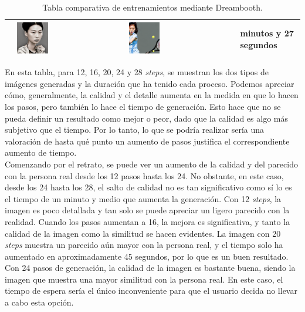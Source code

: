 \begin{table}
\begin{tabular}{>{\centering\arraybackslash}m{3cm} >{\centering\arraybackslash}m{4cm}>{\centering\arraybackslash}m{5cm}>{\centering\arraybackslash}m{3cm}}
		12 & \includegraphics[width = 0.3\textwidth]{Imagenes/Vectorial/12sojungclose.png} & \includegraphics[width = 0.3\textwidth]{Imagenes/Vectorial/12sojungtennis.png} & 2 minutos y 27 segundos\\
		\hline
	\end{tabular}
	\caption{Tabla comparativa de entrenamientos mediante Dreambooth.}
	\label{tab:tabladifsteps}
\end{table}

En esta tabla, para 12, 16, 20, 24 y 28 \textit{steps}, se muestran los dos tipos de imágenes generadas y la duración que ha tenido cada proceso. Podemos apreciar cómo, generalmente, la calidad y el detalle aumenta en la medida en que lo hacen los pasos, pero también lo hace el tiempo de generación. Esto hace que no se pueda definir un resultado como mejor o peor, dado que la calidad es algo más subjetivo que el tiempo. Por lo tanto, lo que se podría realizar sería una valoración de hasta qué punto un aumento de pasos justifica el correspondiente aumento de tiempo.\\

Comenzando por el retrato, se puede ver un aumento de la calidad y del parecido con la persona real desde los 12 pasos hasta los 24. No obstante, en este caso, desde los 24 hasta los 28, el salto de calidad no es tan significativo como sí lo es el tiempo de un minuto y medio que aumenta la generación. Con 12 \textit{steps}, la imagen es poco detallada y tan solo se puede apreciar un ligero parecido con la realidad. Cuando los pasos aumentan a 16, la mejora es significativa, y tanto la calidad de la imagen como la similitud se hacen evidentes. La imagen con 20 \textit{steps} muestra un parecido aún mayor con la persona real, y el tiempo solo ha aumentado en aproximadamente 45 segundos, por lo que es un buen resultado. Con 24 pasos de generación, la calidad de la imagen es bastante buena, siendo la imagen que muestra una mayor similitud con la persona real. En este caso, el tiempo de espera sería el único inconveniente para que el usuario decida no llevar a cabo esta opción.\\

